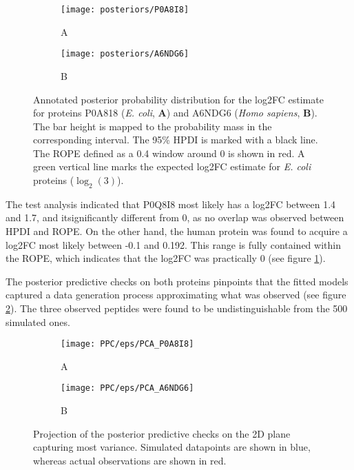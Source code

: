 \begin{figure}[!h]
\centering
\begin{subfigure}{0.8\textwidth}
\caption*{A}
\texttt{[image: posteriors/P0A8I8]}
\end{subfigure}
\bigskip
\begin{subfigure}{0.8\textwidth}
\caption*{B}
\texttt{[image: posteriors/A6NDG6]}
\end{subfigure}
\caption[Posteriors for 2 proteins]{Annotated posterior probability distribution for the \ac{log2FC} estimate for proteins P0A818 (\textit{E. coli}, \textbf{A}) and A6NDG6 (\textit{Homo sapiens}, \textbf{B}). The bar height is mapped to the probability mass in the corresponding interval. The 95\% \ac{HPDI} is marked with a black line. The \ac{ROPE} defined as a 0.4 window around 0 is shown in red. A green vertical line marks the expected \ac{log2FC} estimate for \textit{E. coli} proteins ($\log_2(3)$).}
\label{fig:posteriors}
\end{figure}

The test analysis indicated that P0Q8I8 most likely has a \ac{log2FC} between 1.4 and 1.7, and it\textquotesingle significantly different from 0, as no overlap was observed between \ac{HPDI} and \ac{ROPE}. On the other hand, the human protein was found to acquire a \ac{log2FC} most likely between -0.1 and 0.192. This range is fully contained within the \ac{ROPE}, which indicates that the \ac{log2FC} was practically 0 (see figure \ref{fig:posteriors}).


The posterior predictive checks on both proteins pinpoints that the fitted models captured a data generation process approximating what was observed (see figure \ref{fig:ppc}). The three observed peptides were found to be undistinguishable from the 500 simulated ones.

\begin{figure}[!h]
\centering
\begin{subfigure}{0.8\textwidth}
\caption*{A}
\texttt{[image: PPC/eps/PCA\_P0A8I8]}
\end{subfigure}
\bigskip
\begin{subfigure}{0.8\textwidth}
\caption*{B}
\texttt{[image: PPC/eps/PCA\_A6NDG6]}
\end{subfigure}
\caption[Posterior predictive checks]{Projection of the posterior predictive checks on the 2D plane capturing most variance. Simulated datapoints are shown in blue, whereas actual observations are shown in red.}
\label{fig:ppc}
\end{figure}


